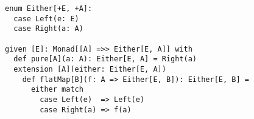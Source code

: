 \begin{algorithm}

\begin{verbatim}
enum Either[+E, +A]:
  case Left(e: E)
  case Right(a: A)

given [E]: Monad[[A] =>> Either[E, A]] with
  def pure[A](a: A): Either[E, A] = Right(a)
  extension [A](either: Either[E, A])
    def flatMap[B](f: A => Either[E, B]): Either[E, B] =
      either match
        case Left(e)  => Left(e)
        case Right(a) => f(a)
\end{verbatim}

\caption{Either monad in Scala. %
\label{monad:either}}
\end{algorithm}